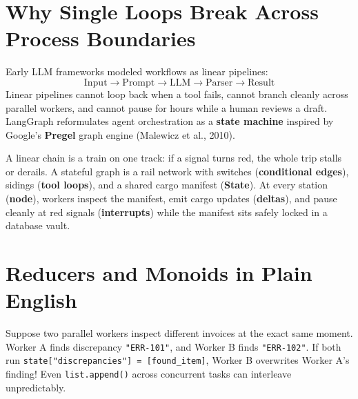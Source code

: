 \section{Why Single Loops Break Across Process Boundaries}

Early LLM frameworks modeled workflows as linear pipelines:
\begin{equation}
\text{Input} \longrightarrow \text{Prompt} \longrightarrow \text{LLM} \longrightarrow \text{Parser} \longrightarrow \text{Result}
\end{equation}
Linear pipelines cannot loop back when a tool fails, cannot branch cleanly across parallel workers, and cannot pause for hours while a human reviews a draft. LangGraph reformulates agent orchestration as a \textbf{state machine} inspired by Google's \textbf{Pregel} graph engine (Malewicz et al., 2010).

\begin{intuitionbox}
A linear chain is a train on one track: if a signal turns red, the whole trip stalls or derails. A stateful graph is a rail network with switches (\textbf{conditional edges}), sidings (\textbf{tool loops}), and a shared cargo manifest (\textbf{State}). At every station (\textbf{node}), workers inspect the manifest, emit cargo updates (\textbf{deltas}), and pause cleanly at red signals (\textbf{interrupts}) while the manifest sits safely locked in a database vault.
\end{intuitionbox}

\section{Reducers and Monoids in Plain English}

Suppose two parallel workers inspect different invoices at the exact same moment. Worker A finds discrepancy \texttt{"ERR-101"}, and Worker B finds \texttt{"ERR-102"}. If both run \texttt{state["discrepancies"] = [found\_item]}, Worker B overwrites Worker A's finding! Even \texttt{list.append()} across concurrent tasks can interleave unpredictably.

